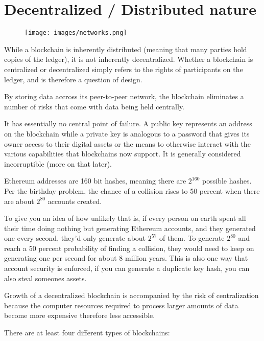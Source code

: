\documentclass{article}
\begin{document}
\section{Decentralized / Distributed nature }


\begin{figure}[hbt!]
 \centering
\texttt{[image: images/networks.png]}
\end{figure}



While a blockchain is inherently distributed (meaning that many parties hold copies of the ledger), it is not inherently decentralized. Whether a blockchain is centralized or decentralized simply refers to the rights of participants on the ledger, and is therefore a question of design.


By storing data accross its peer-to-peer network, the blockchain eliminates a number of risks that come with data being held centrally.

It has essentially no central point of failure. A public key represents an address on the blockchain while a private key is analogous to a password that gives its owner access to their digital assets or the means to otherwise interact with the various capabilities that blockchains now support. It is generally considered incorruptible (more on that later).


Ethereum addresses are 160 bit hashes, meaning there are $2^{160}$ possible hashes. Per the birthday problem, the chance of a collision rises to 50 percent when there are about $2^{80}$ accounts created. \newline

To give you an idea of how unlikely that is, if every person on earth spent all their time doing nothing but generating Ethereum accounts, and they generated one every second, they'd only generate about $2^{57}$ of them. To generate $2^{80}$ and reach a 50 percent probability of finding a collision, they would need to keep on generating one per second for about 8 million years. This is also one way that account security is enforced, if you can generate a duplicate key hash, you can also steal someones assets.


Growth of a decentralized blockchain is accompanied by the risk of centralization because the computer resources required to process larger amounts of data become more expensive therefore less accessible.

There are at least four different types of blockchains:
\end{document}
